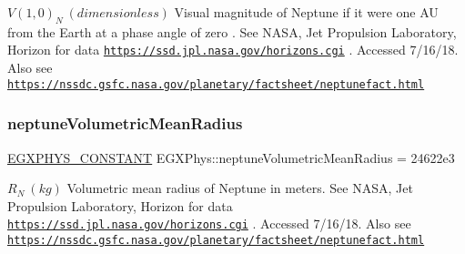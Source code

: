 $ V(1,0)_{N} \ (dimensionless)$ Visual magnitude of Neptune if it were one AU from the Earth at a phase angle of zero . See N\+A\+SA, Jet Propulsion Laboratory, Horizon for data \href{https://ssd.jpl.nasa.gov/horizons.cgi}{\tt https\+://ssd.\+jpl.\+nasa.\+gov/horizons.\+cgi} . Accessed 7/16/18. Also see \href{https://nssdc.gsfc.nasa.gov/planetary/factsheet/neptunefact.html}{\tt https\+://nssdc.\+gsfc.\+nasa.\+gov/planetary/factsheet/neptunefact.\+html} \mbox{\label{group___e_g_x_phys-_constants-_astrophysics-_solar_system-_neptune-_bulk_ga84491897c938da2ce4cfa09326fc8899}} 
\subsubsection{\texorpdfstring{neptune\+Volumetric\+Mean\+Radius}{neptuneVolumetricMeanRadius}}
{\footnotesize\ttfamily \mbox{\hyperlink{group___e_g_x_phys-_constants-_macros_ga76980d288494ce1714c9ac68a95ba702}{E\+G\+X\+P\+H\+Y\+S\+\_\+\+C\+O\+N\+S\+T\+A\+NT}} E\+G\+X\+Phys\+::neptune\+Volumetric\+Mean\+Radius = 24622e3}

$R_{N} \ (kg)$ Volumetric mean radius of Neptune in meters. See N\+A\+SA, Jet Propulsion Laboratory, Horizon for data \href{https://ssd.jpl.nasa.gov/horizons.cgi}{\tt https\+://ssd.\+jpl.\+nasa.\+gov/horizons.\+cgi} . Accessed 7/16/18. Also see \href{https://nssdc.gsfc.nasa.gov/planetary/factsheet/neptunefact.html}{\tt https\+://nssdc.\+gsfc.\+nasa.\+gov/planetary/factsheet/neptunefact.\+html} 